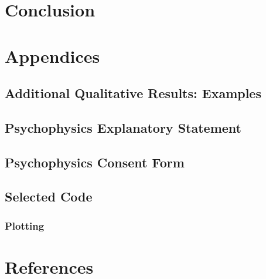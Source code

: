 \documentclass[11pt]{book}
\begin{document}
\part{Conclusion}
\label{sec:orgdc9136a}
\begin{appendices}
\part{Appendices}
\label{sec:org6eab54b}
\chapter{Additional Qualitative Results: Examples}
\label{sec:org91c8641}
\chapter{Psychophysics Explanatory Statement}
\label{sec:orga39179b}
\chapter{Psychophysics Consent Form}
\label{sec:orgf041404}
\chapter{Selected Code}
\label{sec:orgfa043aa}
\section*{Plotting}
\label{sec:org8c98f39}
\clearpage
\part{References}
\label{sec:orge2fe194}


\end{appendices}
\end{document}
